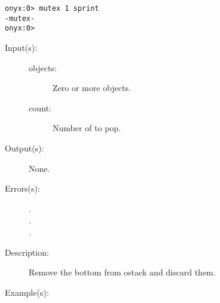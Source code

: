 \begin{description}
\begin{description}
\begin{verbatim}
onyx:0> mutex 1 sprint
-mutex-
onyx:0>
		\end{verbatim}
	\end{description}
\label{systemdict:nbpop}
\item[{\onyxop{objects \dots count}{nbpop}{\dots}}: ]
	\begin{description}\item[]
	\item[Input(s): ]
		\begin{description}\item[]
		\item[objects: ]
			Zero or more objects.
		\item[count: ]
			Number of  to pop.
		\end{description}
	\item[Output(s): ] None.
	\item[Errors(s): ]
		\begin{description}\item[]
		\item[.]
		\item[.]
		\item[.]
		\end{description}
	\item[Description: ]
		Remove the bottom   from ostack and
		discard them.
	\item[Example(s): ]\begin{verbatim}


\end{verbatim}
\end{description}
\end{description}
